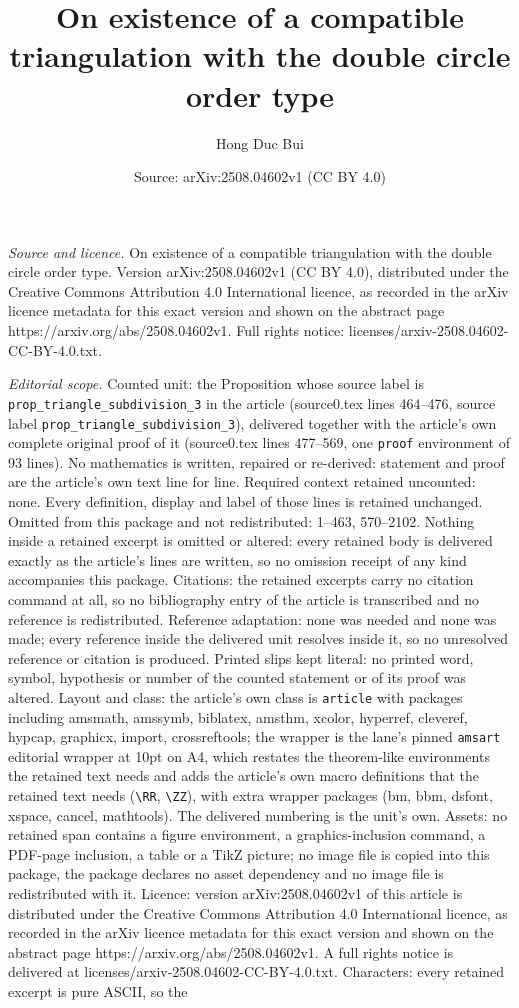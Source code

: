 \documentclass[10pt,a4paper]{amsart}
\title[On existence of a compatible triangulation with the double c]{On existence of a compatible triangulation with the double circle order type}
\author{Hong Duc Bui}
\date{Source: arXiv:2508.04602v1 (CC BY 4.0)}
\begin{document}
\maketitle

\noindent\emph{Source and licence.} On existence of a compatible triangulation with the double circle order type. Version arXiv:2508.04602v1 (CC BY 4.0), distributed under the Creative Commons Attribution 4.0 International licence, as recorded in the arXiv licence metadata for this exact version and shown on the abstract page https://arxiv.org/abs/2508.04602v1. Full rights notice: licenses/arxiv-2508.04602-CC-BY-4.0.txt.\par\smallskip

\noindent\textit{Editorial scope.} Counted unit: the Proposition whose source label is \texttt{prop\_triangle\_subdivision\_3} in the article (source0.tex lines 464--476, source label \texttt{prop\_triangle\_subdivision\_3}), delivered together with the article's own complete original proof of it (source0.tex lines 477--569, one \texttt{proof} environment of 93 lines). No mathematics is written, repaired or re-derived: statement and proof are the article's own text line for line. Required context retained uncounted: none. Every definition, display and label of those lines is retained unchanged. Omitted from this package and not redistributed: 1--463, 570--2102. Nothing inside a retained excerpt is omitted or altered: every retained body is delivered exactly as the article's lines are written, so no omission receipt of any kind accompanies this package. Citations: the retained excerpts carry no citation command at all, so no bibliography entry of the article is transcribed and no reference is redistributed. Reference adaptation: none was needed and none was made; every reference inside the delivered unit resolves inside it, so no unresolved reference or citation is produced. Printed slips kept literal: no printed word, symbol, hypothesis or number of the counted statement or of its proof was altered. Layout and class: the article's own class is \texttt{article} with packages including amsmath, amssymb, biblatex, amsthm, xcolor, hyperref, cleveref, hypcap, graphicx, import, crossreftools; the wrapper is the lane's pinned \texttt{amsart} editorial wrapper at 10pt on A4, which restates the theorem-like environments the retained text needs and adds the article's own macro definitions that the retained text needs (\texttt{\textbackslash RR}, \texttt{\textbackslash ZZ}), with extra wrapper packages (bm, bbm, dsfont, xspace, cancel, mathtools). The delivered numbering is the unit's own. Assets: no retained span contains a figure environment, a graphics-inclusion command, a PDF-page inclusion, a table or a TikZ picture; no image file is copied into this package, the package declares no asset dependency and no image file is redistributed with it. Licence: version arXiv:2508.04602v1 of this article is distributed under the Creative Commons Attribution 4.0 International licence, as recorded in the arXiv licence metadata for this exact version and shown on the abstract page https://arxiv.org/abs/2508.04602v1. A full rights notice is delivered at licenses/arxiv-2508.04602-CC-BY-4.0.txt. Characters: every retained excerpt is pure ASCII, so the 
\end{document}
